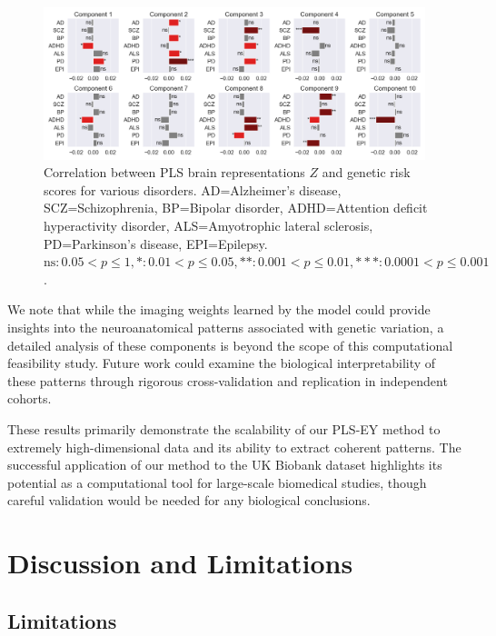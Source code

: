 \begin{figure}
    \centering
    \includegraphics[width=0.99\textwidth,trim={0.5cm 0cm 0.7cm 0cm}]{figures/UKBB/prs_correlations.png}
    \caption{Correlation between PLS brain representations $Z$ and genetic risk scores for various disorders. AD=Alzheimer's disease, SCZ=Schizophrenia, BP=Bipolar disorder, ADHD=Attention deficit hyperactivity disorder, ALS=Amyotrophic lateral sclerosis, PD=Parkinson's disease, EPI=Epilepsy. $\text{ns}: 0.05 < p \leq 1, \ast: 0.01 < p \leq 0.05, \ast\ast: 0.001 < p \leq 0.01, \ast\ast\ast: 0.0001 < p \leq 0.001$.}
    \label{fig:genetic_risk}
    \end{figure}

We note that while the imaging weights learned by the model could provide insights into the neuroanatomical patterns associated with genetic variation, a detailed analysis of these components is beyond the scope of this computational feasibility study. Future work could examine the biological interpretability of these patterns through rigorous cross-validation and replication in independent cohorts.

These results primarily demonstrate the scalability of our PLS-EY method to extremely high-dimensional data and its ability to extract coherent patterns. The successful application of our method to the UK Biobank dataset highlights its potential as a computational tool for large-scale biomedical studies, though careful validation would be needed for any biological conclusions.

\section{Discussion and Limitations}\label{sec:discussion}

\subsection{Limitations}

